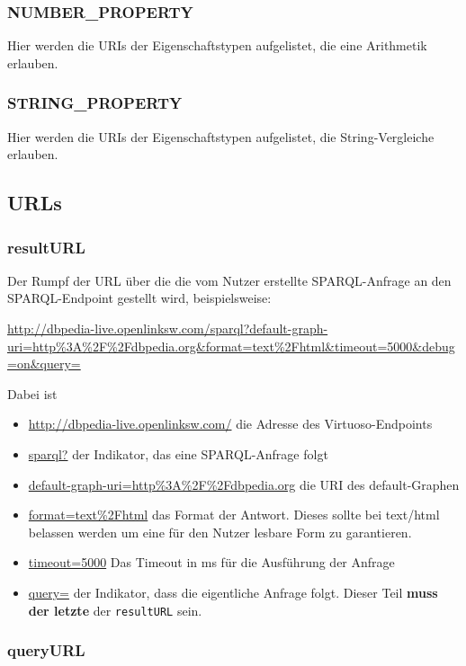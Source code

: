 \subsubsection{NUMBER\_PROPERTY}

Hier werden die URIs der Eigenschaftstypen aufgelistet, die eine
Arithmetik erlauben.

\subsubsection{STRING\_PROPERTY}

Hier werden die URIs der Eigenschaftstypen aufgelistet, die
String-Vergleiche erlauben.

\subsection{URLs}

\subsubsection{resultURL}

Der Rumpf der URL über die die vom Nutzer erstellte SPARQL-Anfrage an
den SPARQL-Endpoint gestellt wird, beispielsweise:

{\small\url{http://dbpedia-live.openlinksw.com/sparql?default-graph-uri=http%3A%2F%2Fdbpedia.org&format=text%2Fhtml&timeout=5000&debug=on&query=}}\medskip

Dabei ist
\begin{itemize}
\item \url{http://dbpedia-live.openlinksw.com/} die Adresse des Virtuoso-Endpoints
\item \url{sparql?} der Indikator, das eine SPARQL-Anfrage folgt
\item \url{default-graph-uri=http%3A%2F%2Fdbpedia.org} 
die URI des default-Graphen
\item \url{format=text%2Fhtml} 
das Format der Antwort. Dieses sollte bei text/html belassen werden um
eine für den Nutzer lesbare Form zu garantieren.
\item \url{timeout=5000} Das Timeout in ms für die Ausführung der
  Anfrage
\item \url{query=} der Indikator, dass die eigentliche Anfrage
  folgt. Dieser Teil \textbf{muss der letzte} der \verb+resultURL+ sein.
\end{itemize}

\subsubsection{queryURL}

